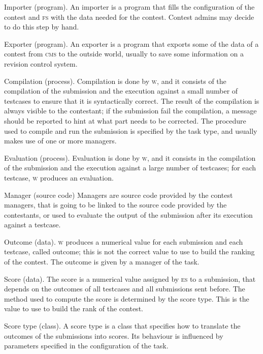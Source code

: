 \documentclass[a4paper,8pt]{amsart}
\newcommand{\CMS}{\textsc{cms}}
\newcommand{\FS}{\textsc{fs}}
\newcommand{\ES}{\textsc{es}}
\newcommand{\WS}{\textsc{w}}
\newenvironment{squishlist}{%
  \begin{list}{\textbullet}%
    { \setlength{\itemsep}{0pt}%
      \setlength{\parsep}{3pt}%
      \setlength{\topsep}{3pt}%
      \setlength{\partopsep}{0pt}%
      \setlength{\leftmargin}{1.5em}%
      \setlength{\labelwidth}{1em}%
      \setlength{\labelsep}{0.5em} }%
}{\end{list}}
\begin{document}
\begin{multicols}{2}
  \begin{squishlist}
  \item[Importer (program).] An importer is a program that fills the
    configuration of the contest and \FS{} with the data needed for
    the contest. Contest admins may decide to do this step by hand.
  \item[Exporter (program).] An exporter is a program that exports
    some of the data of a contest from \CMS{} to the outside world,
    usually to save some information on a revision control system.
  \item[Compilation (process).] Compilation is done by \WS{}, and it
    consists of the compilation of the submission and the execution
    against a small number of testcases to ensure that it is
    syntactically correct. The result of the compilation is always
    visible to the contestant; if the submission fail the compilation,
    a message should be reported to hint at what part needs to be
    corrected. The procedure used to compile and run the submission is
    specified by the task type, and usually makes use of one or more
    managers.
  \item[Evaluation (process).] Evaluation is done by \WS{}, and it
    consists in the compilation of the submission and the execution
    against a large number of testcases; for each testcase, \WS{}
    produces an evaluation.
  \item[Manager (source code)] Managers are source code provided by
    the contest managers, that is going to be linked to the source
    code provided by the contestants, or used to evaluate the output
    of the submission after its execution against a testcase.
  \item[Outcome (data).] \WS{} produces a numerical value for each
    submission and each testcase, called outcome; this is not the
    correct value to use to build the ranking of the contest. The
    outcome is given by a manager of the task.
  \item[Score (data).] The score is a numerical value assigned by
    \ES{} to a submission, that depends on the outcomes of all
    testcases and all submissions sent before. The method used to
    compute the score is determined by the score type. This is the
    value to use to build the rank of the contest.
  \item[Score type (class).] A score type is a class that specifies
    how to translate the outcomes of the submissions into scores. Its
    behaviour is influenced by parameters specified in the
    configuration of the task.

\end{squishlist}
\end{multicols}
\end{document}
